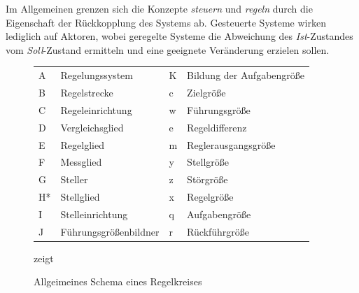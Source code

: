 
Im Allgemeinen grenzen sich die Konzepte \textit{steuern} und \textit{regeln} durch die Eigenschaft der Rückkopplung des Systems ab. Gesteuerte Systeme wirken lediglich auf Aktoren, wobei geregelte Systeme die Abweichung des \textit{Ist}-Zustandes vom \textit{Soll}-Zustand ermitteln und eine geeignete Veränderung erzielen sollen.




\begin{figure}[ht!]
\vspace{0.25cm}
\begin{center}

\begin{tabular}{ll|ll}
	A  & Regelungssystem       & K & Bildung der Aufgabengröße \\
	B  & Regelstrecke          & c & Zielgröße                 \\
	C  & Regeleinrichtung      & w & Führungsgröße             \\
	D  & Vergleichsglied       & e & Regeldifferenz            \\
	E  & Regelglied            & m & Reglerausgangsgröße       \\
	F  & Messglied             & y & Stellgröße                \\
	G  & Steller               & z & Störgröße                 \\
	H* & Stellglied            & x & Regelgröße                \\
	I  & Stelleinrichtung      & q & Aufgabengröße             \\
	J  & Führungsgrößenbildner & r & Rückführgröße            
\end{tabular}
\caption{Allgeimeines Schema eines Regelkreises \cite{IEC60050-351}}
\label{fig:Contr}
\end{center}
\vspace{0.25cm}
 zeigt \missing\
\end{figure}






